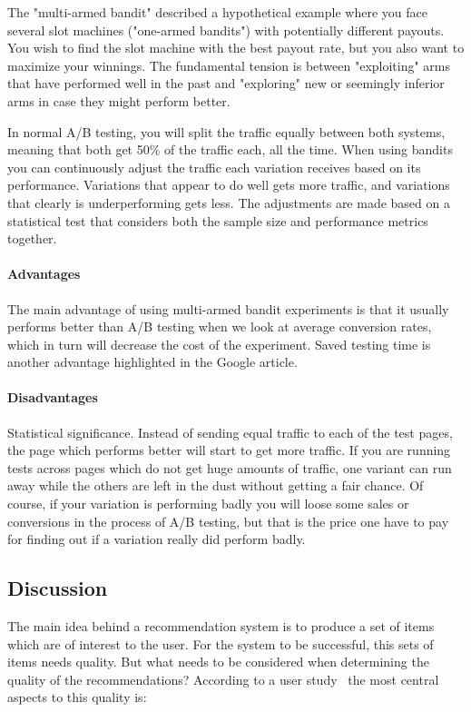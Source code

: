 	The "multi-armed bandit" described a hypothetical example where you face several slot machines ("one-armed bandits")
	with potentially different payouts. You wish to find the slot machine with the best payout rate, but you also want to
	maximize your winnings. The fundamental tension is between "exploiting" arms that have performed well in the past
	and "exploring" new or seemingly inferior arms in case they might perform better.

	In normal A/B testing, you will split the traffic equally between both systems, meaning that both get 50\% of the
	traffic each, all the time. When using bandits you can continuously adjust the traffic each variation receives based on its
	performance. Variations that appear to do well gets more traffic, and variations that clearly is underperforming
	gets less. The adjustments are made based on a statistical test that considers both the sample size and performance
	metrics together.

	\paragraph{Advantages}

	The main advantage of using multi-armed bandit experiments is that it usually performs better than A/B testing
	when we look at average conversion rates, which in turn will decrease the cost of the experiment.
	Saved testing time is another advantage highlighted in the Google article.

	\paragraph{Disadvantages}

	Statistical significance. Instead of sending equal traffic to each of the test pages, the page which performs
	better will start to get more traffic. If you are running tests across pages which do not get huge amounts of
	traffic, one variant can run away while the others are left in the dust without getting a fair chance. Of course,
	if your variation is performing badly you will loose some sales or conversions in the process of A/B testing,
	but that is the price one have to pay for finding out if a variation really did perform badly.

\subsection{Discussion}
The main idea behind a recommendation system is to produce a set of items which are of interest to the user.
For the system to be successful, this sets of items needs quality.
But what needs to be considered when determining the quality of the recommendations?
According to a user study~\cite{Pu:2011:UEF:2043932.2043962} the most central aspects to this quality is:

